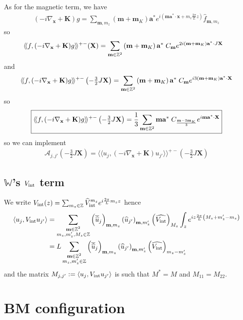 \documentclass[11pt,a4paper,reqno,french,tikz]{amsart}
\newcommand\cA{\mathcal{A}}\newcommand\cB{\mathcal{B}}\newcommand\cC{\mathcal{C}}\newcommand\cD{\mathcal{D}}\newcommand\cE{\mathcal{E}}\newcommand\cF{\mathcal{F}}\newcommand\cG{\mathcal{G}}\newcommand\cH{\mathcal{H}}\newcommand\cI{\mathcal{I}}\newcommand\cJ{\mathcal{J}}\newcommand\cK{\mathcal{K}}\newcommand\cL{\mathcal{L}}\newcommand\cM{\mathcal{M}}\newcommand\cN{\mathcal{N}}\newcommand\cO{\mathcal{O}}\newcommand\cP{\mathcal{P}}\newcommand\cQ{\mathcal{Q}}\newcommand\cR{\mathcal{R}}\newcommand\cS{\mathcal{S}}\newcommand\cT{\mathcal{T}}\newcommand\cU{\mathcal{U}}\newcommand\cV{\mathcal{V}}\newcommand\cW{\mathcal{W}}\newcommand\cX{\mathcal{X}}\newcommand\cY{\mathcal{Y}}\newcommand\cZ{\mathcal{Z}}
\newcommand{\pa}[1]{\left( #1 \right)} %
\newcommand{\ps}[1]{\left< #1 \right>} %
\newcommand{\na}{\nabla} %
\newcommand{\f}[2]{\frac{#1}{#2}} %
\newcommand{\ind}[1]{_{\textup{#1}}} %
\def\bX{{\mathbf X}}
\def\ba{{\mathbf a}}
\def\bx{{\mathbf x}}
\def\bmm{{\mathbf m}}
\def\bK{{\mathbf K}}
\def\bbW{{\mathbb W}}
\def\lAngle{\langle\!\langle}
\def\rAngle{\rangle\!\rangle}
\begin{document}
As for the magnetic term, we have
\begin{align*}
\pa{-i\na_\bx + \bK} g = \sum_{\bmm,m_z} \pa{\bmm + \bmm_K} \ba^* e^{i\pa{\bmm \ba^* \cdot \bx + m_z \f{2\pi}L z}} \widehat{f}_{\bmm,m_z}
\end{align*}
so
\begin{align*}
	\lAngle &f, (-i\nabla_\bx+\bK) g \rAngle^{+-}(\bX) =  \sum_{\bmm \in \Z^2} \pa{\bmm + \bmm_K}\ba^* \; C_\bmm e^{2i \pa{\bmm + \bmm_K} \ba^* \cdot J\bX} 
\end{align*}
and
\begin{align*}
\lAngle f, (-i\nabla_\bx+\bK) g \rAngle^{+-}\pa{-\tfrac{3}{2}J\bX} =  \sum_{\bmm \in \Z^2} \pa{\bmm + \bmm_K}\ba^* \; C_\bmm e^{i 3 \pa{\bmm + \bmm_K} \ba^* \cdot \bX}
\end{align*}
so
\begin{align*}
\boxed{\lAngle f, (-i\nabla_\bx+\bK) g \rAngle^{+-}\pa{-\tfrac{3}{2}J\bX} = \f {1}3 \sum_{\bmm \in \Z^2} \bmm \ba^* \; C_{\f{\bmm - 3\bmm_K}{3}} e^{i \bmm \ba^* \cdot \bX} }
\end{align*}
so we can implement
\begin{align*}
\bm{\cA}_{j,j'}\pa{-\tfrac{3}{2}J\bX} = \lAngle u_j, (-i\nabla_\bx+\bK) u_{j'} \rAngle^{+-}\pa{-\tfrac{3}{2}J\bX}
\end{align*}

\subsection{$\bbW$'s $V\ind{int}$ term}%
\label{sub:_bbw_s_vint_term}
We write $V\ind{int}(z) = \sum_{m_z \in \Z} \widehat{V}\ind{int}^{m_z} e^{i \f{2\pi}L m_z z}$ hence
\begin{align*}
	\ps{u_j, V\ind{int} u_{j'}} &= \sum_{\substack{\bmm \in \Z^2 \\ m_z,m_z',M_z \in \Z}} \pa{\overline{\widehat{u}}_j}_{\bmm,m_z} \pa{\widehat{u}_{j'}}_{\bmm,m_z'}\pa{\widehat{V\ind{int}}}_{M_z} \int_z e^{iz \f{2\pi}{L} \pa{M_z + m_z'-m_z}} \\
& = L \sum_{\substack{\bmm \in \Z^2 \\ m_z,m_z' \in \Z}} \pa{\overline{\widehat{u}}_j}_{\bmm,m_z} \pa{\widehat{u}_{j'}}_{\bmm,m_z'}\pa{\widehat{V\ind{int}}}_{m_z-m_z'} 
\end{align*}
and the matrix $M_{j,j'} := \ps{u_j, V\ind{int} u_{j'}}$ is such that $M^* = M$ and $M_{11} = M_{22}$.





\section{BM configuration}%
\label{sec:bm_configuration}
\end{document}
